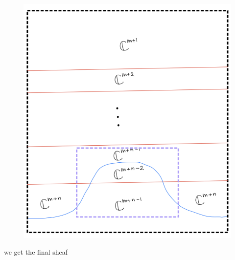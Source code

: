 \begin{enumerate}[label=(\roman*)]
\begin{enumerate}[label=(Step \arabic*)]
\begin{figure}[H]
    \centering
    \includegraphics[scale = 0.95]{diagrams/cobord7/6.png}
    \caption{}
    \label{fig:your-label}
\end{figure}

we get the final sheaf


\end{enumerate}
\end{enumerate}
